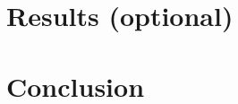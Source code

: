 \documentclass[12pt]{article}
\begin{document}
\section{Results (optional)}

\lipsum[9]

\section{Conclusion}

\lipsum[10]

{}

\end{document}
